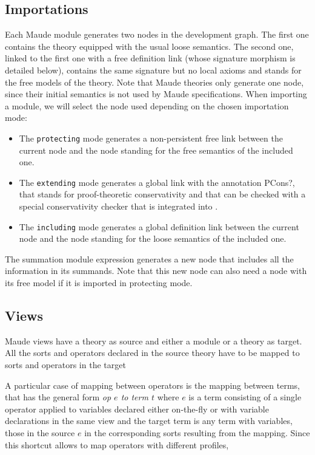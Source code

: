 \subsection{Importations}

Each Maude module generates two nodes in the development
graph. The first one contains the theory equipped with the usual
loose semantics. The second one, linked
to the first one with a free definition link (whose signature morphism
is detailed below), contains the same signature but
no local axioms and stands for the free models of the theory.
Note that Maude theories only generate one node, since their initial
semantics is not used by Maude specifications.
When importing a module, we will select the node used depending on the
chosen importation mode:
\begin{itemize}

\item
The \verb"protecting" mode generates a non-persistent free link between
the current node and the node standing for the free semantics of the
included one. 

\item
The \verb"extending" mode generates a global link with the annotation
\textsf{PCons?}, that stands for proof-theoretic conservativity and that
can be checked with a special conservativity checker that is
integrated into \Hets.

\item
The \verb"including" mode generates a global definition link between the
current node  and the node standing for the loose semantics of the
included one.
\end{itemize}

The summation module expression generates a new node that includes all 
the information in its summands. Note that this new node can also need
a node with its free model if it is imported in protecting mode.

\subsection{Views}\label{subsec:dg_views}

Maude views have a theory as source and either a module or a theory
as target. All the sorts and operators declared in the source theory
have to be mapped to sorts and operators in the target

A particular case of mapping between operators is the mapping between
terms, that has the general form \emph{op $e$ to term $t$}
where $e$ is a term consisting of a 
single operator applied to variables declared either on-the-fly or with
variable declarations in the same view and the target term is any term
with variables, those in the source $e$ in the corresponding sorts
resulting from the mapping.
Since this shortcut allows to map operators with different profiles,




